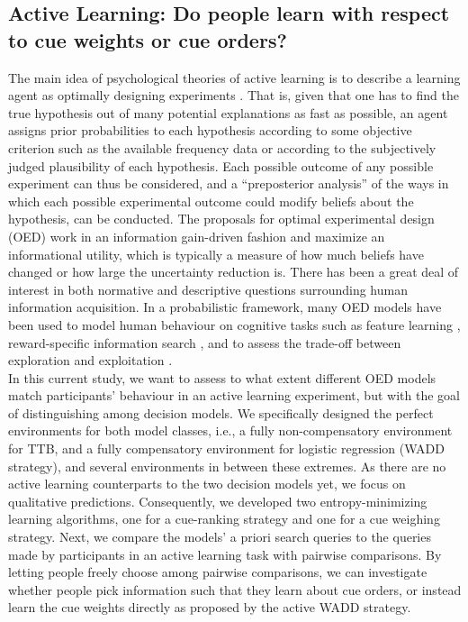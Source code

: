 \documentclass[10pt,letterpaper]{article}
\begin{document}
\subsection{Active Learning: Do people learn with respect to cue weights or cue orders?}
The main idea of psychological theories of active learning is to describe a learning agent as optimally designing experiments \citep{chaloner1989optimal}. That is, given that one has to find the true hypothesis out of many potential explanations as fast as possible, an agent assigns prior probabilities to each hypothesis according to some objective criterion such as the available frequency data or according to the subjectively judged plausibility of each hypothesis. Each possible outcome of any possible experiment can thus be considered, and a ``preposterior analysis'' \citep{raiffaapplied} of the ways in which each possible experimental outcome could modify beliefs about the hypothesis, can be conducted. The proposals for optimal experimental design (OED) work in an information gain-driven fashion and maximize an informational utility, which is typically a measure of how much beliefs have changed or how large the uncertainty reduction is. There has been a great deal of interest in both normative and descriptive questions surrounding human information acquisition. In a probabilistic framework, many OED models have been used to model human behaviour on cognitive tasks such as feature learning \citep{griffiths2009analyzing}, reward-specific information search \citep{meder2012information}, and to assess the trade-off between exploration and exploitation \citep{knox2011nature}.\\
In this current study, we want to assess to what extent different OED models match participants' behaviour in an active learning experiment, but with the goal of distinguishing among decision models. We specifically designed the perfect environments for both model classes, i.e., a fully non-compensatory environment for TTB, and a fully compensatory environment for logistic regression (WADD strategy), and several environments in between these extremes. As there are no active learning counterparts to the two decision models yet, we focus on qualitative predictions. Consequently, we developed two entropy-minimizing learning algorithms, one for a cue-ranking strategy and one for a cue weighing strategy. Next, we compare the models' a priori search queries to the queries made by participants in an active learning task with pairwise comparisons. By letting people freely choose among pairwise comparisons, we can investigate whether people pick information such that they learn about cue orders, or instead learn the cue weights directly as proposed by the active WADD strategy.
\end{document}
